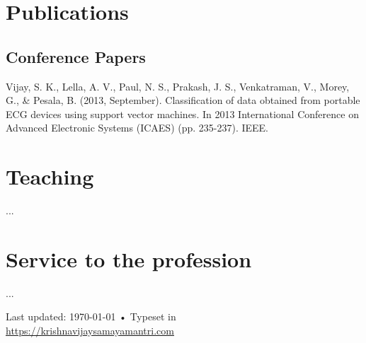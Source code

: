 \documentclass[10pt, a4paper]{article}
\newcommand{\years}[1]{\marginnote{\scriptsize #1}}
\begin{document}
\section*{Publications}

\subsection*{Conference Papers}
\noindent
\years{2013} Vijay, S. K., Lella, A. V., Paul, N. S., Prakash, J. S., Venkatraman, V., Morey, G., \& Pesala, B. (2013, September). Classification of data obtained from portable ECG devices using support vector machines. In 2013 International Conference on Advanced Electronic Systems (ICAES) (pp. 235-237). IEEE.





\section*{Teaching}

...

\section*{Service to the profession}

...
\vfill{}

\begin{center}
{\scriptsize  Last updated: \today\- •\- 
Typeset in \href{http://nitens.org/taraborelli/cvtex}{
\XeTeX }\\
\href{https://krishnavijaysamayamantri.com}{https://krishnavijaysamayamantri.com}}
\end{center}
\end{document}
